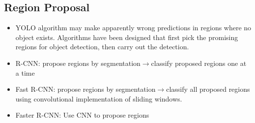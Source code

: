 \subsection{Region Proposal}
\begin{itemize}
  \item YOLO algorithm may make apparently wrong predictions in regions where no object exists. Algorithms have been designed that first pick the promising regions for object detection, then carry out the detection.
  \item R-CNN: propose regions by segmentation$\rightarrow$classify proposed regions one at a time
  \item Fast R-CNN: propose regions by segmentation$\rightarrow$classify all proposed regions using convolutional implementation of sliding windows.
  \item Faster R-CNN: Use CNN to propose regions
\end{itemize}
\ifx\PREAMBLE\undefined

\fi